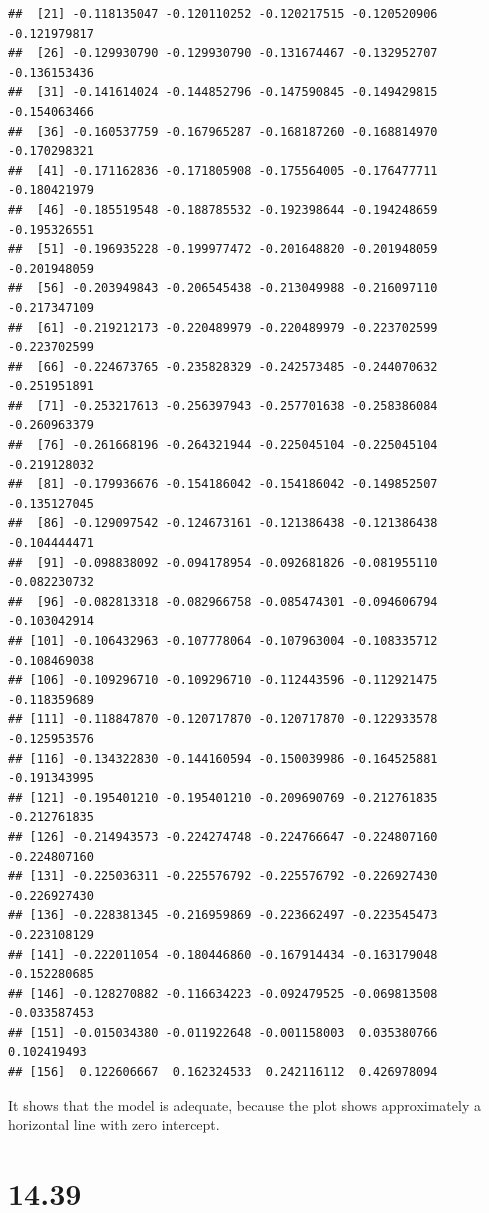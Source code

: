 \documentclass{article}\usepackage[]{graphicx}\usepackage[]{color}
\makeatletter
\newenvironment{kframe}{%
 \def\at@end@of@kframe{}%
 \ifinner\ifhmode%
  \def\at@end@of@kframe{\end{minipage}}%
  \begin{minipage}{\columnwidth}%
 \fi\fi%
 \def\FrameCommand##1{\hskip\@totalleftmargin \hskip-\fboxsep
 \colorbox{shadecolor}{##1}\hskip-\fboxsep
     \hskip-\linewidth \hskip-\@totalleftmargin \hskip\columnwidth}%
 \MakeFramed {\advance\hsize-\width
   \@totalleftmargin\z@ \linewidth\hsize
   \@setminipage}}%
 {\par\unskip\endMakeFramed%
 \at@end@of@kframe}
\newenvironment{knitrout}{}{} %
\makeatother
\begin{document}
\begin{enumerate}[(a)]
\begin{knitrout}
\begin{kframe}
\begin{verbatim}
##  [21] -0.118135047 -0.120110252 -0.120217515 -0.120520906 -0.121979817
##  [26] -0.129930790 -0.129930790 -0.131674467 -0.132952707 -0.136153436
##  [31] -0.141614024 -0.144852796 -0.147590845 -0.149429815 -0.154063466
##  [36] -0.160537759 -0.167965287 -0.168187260 -0.168814970 -0.170298321
##  [41] -0.171162836 -0.171805908 -0.175564005 -0.176477711 -0.180421979
##  [46] -0.185519548 -0.188785532 -0.192398644 -0.194248659 -0.195326551
##  [51] -0.196935228 -0.199977472 -0.201648820 -0.201948059 -0.201948059
##  [56] -0.203949843 -0.206545438 -0.213049988 -0.216097110 -0.217347109
##  [61] -0.219212173 -0.220489979 -0.220489979 -0.223702599 -0.223702599
##  [66] -0.224673765 -0.235828329 -0.242573485 -0.244070632 -0.251951891
##  [71] -0.253217613 -0.256397943 -0.257701638 -0.258386084 -0.260963379
##  [76] -0.261668196 -0.264321944 -0.225045104 -0.225045104 -0.219128032
##  [81] -0.179936676 -0.154186042 -0.154186042 -0.149852507 -0.135127045
##  [86] -0.129097542 -0.124673161 -0.121386438 -0.121386438 -0.104444471
##  [91] -0.098838092 -0.094178954 -0.092681826 -0.081955110 -0.082230732
##  [96] -0.082813318 -0.082966758 -0.085474301 -0.094606794 -0.103042914
## [101] -0.106432963 -0.107778064 -0.107963004 -0.108335712 -0.108469038
## [106] -0.109296710 -0.109296710 -0.112443596 -0.112921475 -0.118359689
## [111] -0.118847870 -0.120717870 -0.120717870 -0.122933578 -0.125953576
## [116] -0.134322830 -0.144160594 -0.150039986 -0.164525881 -0.191343995
## [121] -0.195401210 -0.195401210 -0.209690769 -0.212761835 -0.212761835
## [126] -0.214943573 -0.224274748 -0.224766647 -0.224807160 -0.224807160
## [131] -0.225036311 -0.225576792 -0.225576792 -0.226927430 -0.226927430
## [136] -0.228381345 -0.216959869 -0.223662497 -0.223545473 -0.223108129
## [141] -0.222011054 -0.180446860 -0.167914434 -0.163179048 -0.152280685
## [146] -0.128270882 -0.116634223 -0.092479525 -0.069813508 -0.033587453
## [151] -0.015034380 -0.011922648 -0.001158003  0.035380766  0.102419493
## [156]  0.122606667  0.162324533  0.242116112  0.426978094
\end{verbatim}
\end{kframe}
\end{knitrout}

\qquad It shows that the model is adequate, because the plot shows approximately a horizontal line with zero intercept.

\end{enumerate}

\section{14.39}
\end{document}
